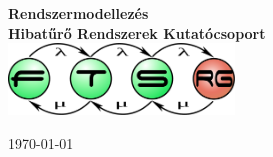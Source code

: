 \begin{titlepage}
\begin{center}
\vspace*{5cm}

{\huge \bfseries Rendszermodellezés}\\[0.8cm]

{\Large \bfseries Hibatűrő Rendszerek Kutatócsoport}\\[0.8cm]

\includegraphics[width=60mm,keepaspectratio]{figures/ftsrg-logo}\\

\vfill

{\large \today}

\vspace{3cm}
\end{center}
\end{titlepage}
